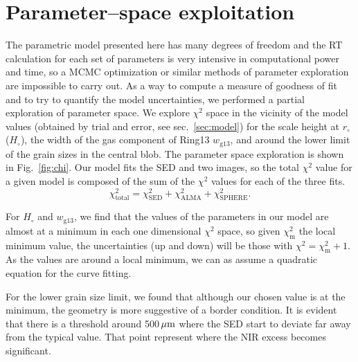 \documentclass[fleqn,usenatbib,useAMS]{mnras}
\begin{document}

\appendix

\section{Parameter--space exploitation} \label{sec:Appendix}

The parametric model presented here has many degrees of freedom and the RT calculation for each set of parameters is very intensive in computational power and time, so a MCMC optimization or similar methods of parameter exploration are impossible to carry out. As a way to compute a measure of goodness of fit and to try to quantify the model uncertainties, we performed a partial exploration of parameter space. We explore $\chi^2$ space in the vicinity of the model values (obtained by trial and error, see sec.~\ref{sec:model}) for the scale height at $r_\circ$ ($H_\circ$), the width of the gas component of Ring13 $w_{\mathrm{g13}}$, and around the lower limit of the grain sizes in the central blob. The parameter space exploration is shown in Fig.~\ref{fig:chi}. Our model fits the SED and two images, so the total $\chi^2$ value for a given model is composed of the sum of the $\chi^2$ values for each of the three fits.
\begin{equation}
    \chi^2_{\mathrm{total}}=\chi^2_{\mathrm{SED}}+\chi^2_{\mathrm{ALMA}}+\chi^2_{\mathrm{SPHERE}}.
\end{equation}

For $H_\circ$ and $w_{\mathrm{g13}}$, we find that the values of the parameters in our model are almost at a minimum in each one dimensional $\chi^2$ space, so given $\chi^2_\mathrm{m}$ the local minimum value, the uncertainties (up and down) will be those with $\chi^2=\chi^2_\mathrm{m}+1$. As the values are around a local minimum, we can as assume a quadratic equation for the curve fitting.

For the lower grain size limit, we found that although our chosen value is at the minimum, the geometry is more suggestive of a border condition. It is evident that there is a threshold around 500\,$\hbox{$\mu$m}$ where the SED start to deviate far away from the typical value. That point represent where the NIR excess becomes significant.

\end{document}

